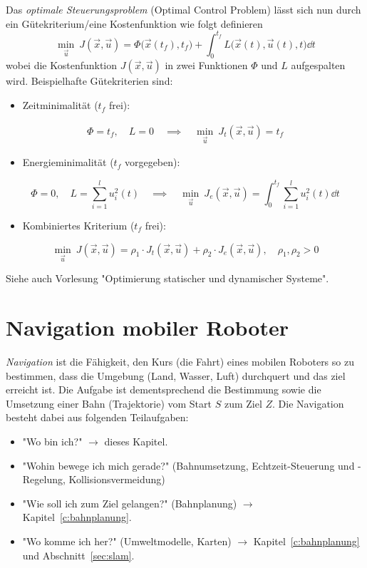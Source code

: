 			Das \emph{optimale Steuerungsproblem} (Optimal Control Problem) lässt sich nun durch ein Gütekriterium/eine Kostenfunktion wie folgt definieren
			\begin{equation*}
				\min_{\vec{u}} \> J(\vec{x}, \vec{u}) = \Phi\big(\vec{x}(t_f), t_f\big) + \int_{0}^{t_f} \! L\big(\vec{x}(t), \vec{u}(t), t\big) \dd{t}
			\end{equation*}
			wobei die Kostenfunktion \( J(\vec{x}, \vec{u}) \) in zwei Funktionen \( \Phi \) und \( L \) aufgespalten wird. Beispielhafte Gütekriterien sind:
			\begin{itemize}
				\item Zeitminimalität (\(t_f\) frei):
			\end{itemize}
			\begin{gather*}
				\Phi = t_f,\quad L = 0 \quad\implies\quad \min_{\vec{u}} \> J_t(\vec{x}, \vec{u}) = t_f
			\end{gather*}
			\begin{itemize}
				\item Energieminimalität (\(t_f\) vorgegeben):
			\end{itemize}
			\begin{equation*}
				\Phi = 0,\quad L = \sum_{i = 1}^{l} u_i^2 (t) \quad\implies\quad \min_{\vec{u}} \> J_e(\vec{x}, \vec{u}) = \int_{0}^{t_f} \! \sum_{i = 1}^{l} u_i^2 (t) \dd{t}
			\end{equation*}
			\begin{itemize}
				\item Kombiniertes Kriterium (\(t_f\) frei):
			\end{itemize}
			\begin{equation*}
				\min_{\vec{u}} \> J(\vec{x}, \vec{u}) = \rho_1 \cdot J_t(\vec{x}, \vec{u}) + \rho_2 \cdot J_e(\vec{x}, \vec{u}),\quad \rho_1, \rho_2 > 0
			\end{equation*}
			
			Siehe auch Vorlesung "Optimierung statischer und dynamischer Systeme".

\chapter{Navigation mobiler Roboter}
	\emph{Navigation} ist die Fähigkeit, den Kurs (die Fahrt) eines mobilen Roboters so zu bestimmen, dass die Umgebung (Land, Wasser, Luft) durchquert und das ziel erreicht ist. Die Aufgabe ist dementsprechend die Bestimmung sowie die Umsetzung einer Bahn (\bzw Trajektorie) vom Start \(S\) zum Ziel \(Z\). Die Navigation besteht dabei aus folgenden Teilaufgaben:
	\begin{itemize}
		\item "Wo bin ich?" \(\to\) dieses Kapitel.
		\item "Wohin bewege ich mich gerade?" (Bahnumsetzung, Echtzeit-Steuerung und -Regelung, Kollisionsvermeidung)
		\item "Wie soll ich zum Ziel gelangen?" (Bahnplanung) \(\to\) Kapitel~\ref{c:bahnplanung}.
		\item "Wo komme ich her?" (Umweltmodelle, Karten) \(\to\) Kapitel~\ref{c:bahnplanung} und Abschnitt~\ref{sec:slam}.
	\end{itemize}

